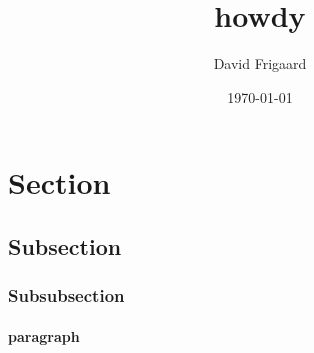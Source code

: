 \documentclass[]{../frigaardreport}
\author{David Frigaard}
\title{howdy}
\date{\today}
\begin{document}
\section{Section}
\lipsum[1]
\subsection{Subsection}
\lipsum[2]
\subsubsection{Subsubsection}
\paragraph{paragraph} \lipsum[3]
\end{document}
